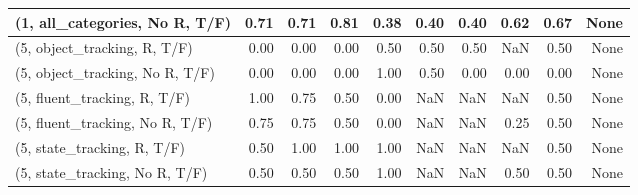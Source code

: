 \begin{table*}[h!]
\begin{adjustbox}{width=2\columnwidth,center}
\begin{tabular}{lrrr|rrr|rrr}
(1, all\_categories, No R, T/F)       &                      0.71 &                  0.71 &                      0.81 &                          0.38 &                      0.40 &                          0.40 &                                   0.62 &                               0.67 &                                  None \\



\midrule
(5, object\_tracking, R, T/F)         &                      0.00 &                  0.00 &                      0.00 &                          0.50 &                      0.50 &                          0.50 &                                    NaN &                               0.50 &                                  None \\
(5, object\_tracking, No R, T/F)      &                      0.00 &                  0.00 &                      0.00 &                          1.00 &                      0.50 &                          0.00 &                                   0.00 &                               0.00 &                                  None \\
(5, fluent\_tracking, R, T/F)         &                      1.00 &                  0.75 &                      0.50 &                          0.00 &                       NaN &                           NaN &                                    NaN &                               0.50 &                                  None \\
(5, fluent\_tracking, No R, T/F)      &                      0.75 &                  0.75 &                      0.50 &                          0.00 &                       NaN &                           NaN &                                   0.25 &                               0.50 &                                  None \\
(5, state\_tracking, R, T/F)          &                      0.50 &                  1.00 &                      1.00 &                          1.00 &                       NaN &                           NaN &                                    NaN &                               0.50 &                                  None \\
(5, state\_tracking, No R, T/F)       &                      0.50 &                  0.50 &                      0.50 &                          1.00 &                       NaN &                           NaN &                                   0.50 &                               0.50 &                                  None \\

\end{tabular}
\end{adjustbox}
\end{table*}
